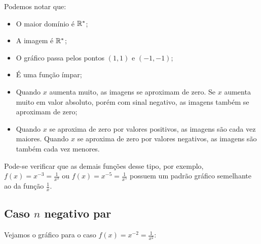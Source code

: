     Podemos notar que:
    \begin{itemize}
        \item O maior domínio é $\mathbb{R}^{*}$;
        \item A imagem é $\mathbb{R}^{*}$;
        \item O gráfico passa pelos pontos $(1,1)$ e $(-1,-1)$;
        \item É uma função ímpar;
        \item Quando $x$ aumenta muito, as imagens se aproximam de zero. Se $x$ aumenta muito em valor absoluto, porém com sinal negativo, as imagens também se aproximam de zero;
        \item Quando $x$ se aproxima de zero por valores positivos, as imagens são cada vez maiores. Quando $x$ se aproxima de zero por valores negativos, as imagens são também cada vez menores.
    \end{itemize}

Pode-se verificar que as demais funções desse tipo, por exemplo, $f(x)=x^{-3}=\frac{1}{x^3}$ ou $f(x)=x^{-5}=\frac{1}{x^5}$ possuem um padrão gráfico semelhante ao da função $\frac{1}{x}$.

    

        \subsection{Caso $n$ negativo par}

Vejamos o gráfico para o caso $f(x)=x^{-2}=\frac{1}{x^2}$:
\begin{center}
\end{center}

